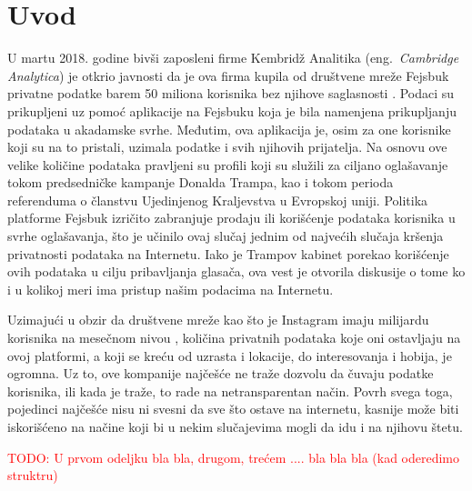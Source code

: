\documentclass[a4paper]{article}
\newcommand\todos[1]{\textcolor{red}{#1}}
\begin{document}
\section{Uvod}
\label{sec:uvod}
\par U martu 2018. godine bivši zaposleni firme Kembridž Analitika (eng.~{\em Cambridge Analytica}) je otkrio javnosti da je ova firma kupila od društvene mreže Fejsbuk privatne podatke barem 50 miliona korisnika bez njihove saglasnosti \cite{guardian}. Podaci su prikupljeni uz pomoć aplikacije na Fejsbuku koja je bila namenjena prikupljanju podataka u akadamske svrhe. Međutim, ova aplikacija je, osim za one korisnike koji su na to pristali, uzimala podatke i svih njihovih prijatelja. Na osnovu ove velike količine podataka pravljeni su profili koji su služili za ciljano oglašavanje tokom predsedničke kampanje Donalda Trampa, kao i tokom perioda referenduma o članstvu Ujedinjenog Kraljevstva u Evropskoj uniji. Politika platforme Fejsbuk izričito zabranjuje prodaju ili korišćenje podataka korisnika u svrhe oglašavanja, što je učinilo ovaj slučaj jednim od najvećih slučaja kršenja privatnosti podataka na Internetu. Iako je Trampov kabinet porekao korišćenje ovih podataka u cilju pribavljanja glasača, ova vest je otvorila diskusije o tome ko i u kolikoj meri ima pristup našim podacima na Internetu.
\par Uzimajući u obzir da društvene mreže kao što je Instagram imaju milijardu korisnika na mesečnom nivou \cite{instagram}, količina privatnih podataka koje oni ostavljaju na ovoj platformi, a koji se kreću od uzrasta i lokacije, do interesovanja i hobija, je ogromna. Uz to, ove kompanije najčešće ne traže dozvolu da čuvaju podatke korisnika, ili kada je traže, to rade na netransparentan način. Povrh svega toga, pojedinci najčešće nisu ni svesni da sve što ostave na internetu, kasnije može biti iskorišćeno na načine koji bi u nekim slučajevima mogli da idu i na njihovu štetu.
\par
\todos{TODO: U prvom odeljku bla bla, drugom, trećem .... bla bla bla (kad oderedimo struktru)}
\end{document}
